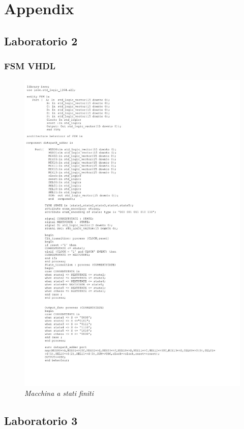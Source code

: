 \chapter{Appendix}
\newpage
\section{Laboratorio 2}
\subsection{FSM VHDL}
\nopagebreak
\begin{figure}[!htb]
	\centering
	\includegraphics[scale=0.3]{immagini/fsm}
	\caption{\textit{Macchina a stati finiti}}
	\label{fsm}
\end{figure}
\newpage
\section{Laboratorio 3}
